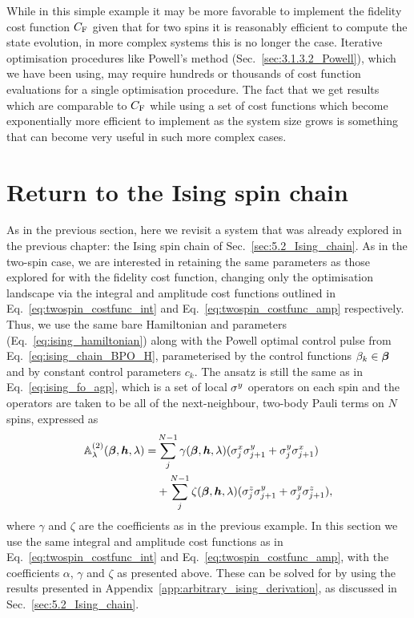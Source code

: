 While in this simple example it may be more favorable to implement the fidelity cost function $C_{\rm F}$ given that for two spins it is reasonably efficient to compute the state evolution, in more complex systems this is no longer the case. Iterative optimisation procedures like Powell's method (Sec.~\ref{sec:3.1.3.2_Powell}), which we have been using, may require hundreds or thousands of cost function evaluations for a single optimisation procedure. The fact that we get results which are comparable to $C_{\rm F}$ while using a set of cost functions which become exponentially more efficient to implement as the system size grows is something that can become very useful in such more complex cases.

\section{Return to the Ising spin chain}\label{sec:7.2_ising_ho_lcd}

As in the previous section, here we revisit a system that was already explored in the previous chapter: the Ising spin chain of Sec.~\ref{sec:5.2_Ising_chain}. As in the two-spin case, we are interested in retaining the same parameters as those explored for  with the fidelity cost function, changing only the optimisation landscape via the integral and amplitude cost functions outlined in Eq.~\eqref{eq:twospin_costfunc_int} and Eq.~\eqref{eq:twospin_costfunc_amp} respectively. Thus, we use the same bare Hamiltonian and parameters (Eq.~\eqref{eq:ising_hamiltonian}) along with the Powell optimal control pulse from Eq.~\eqref{eq:ising_chain_BPO_H}, parameterised by the control functions $\beta_k \in \boldsymbol{\beta}$ and by constant control parameters $c_k$. The   ansatz is still the same as in Eq.~\eqref{eq:ising_fo_agp}, which is a set of local $\sigma^y$ operators on each spin and the  operators are taken to be all of the next-neighbour, two-body Pauli terms on $N$ spins, expressed as
\begin{equation}
    \begin{aligned}
        \mathbb{A}_{\lambda}^{(2)}(\boldsymbol{\beta}, \boldsymbol{h}, \lambda) = & \sum_j^{N-1} \gamma(\boldsymbol{\beta}, \boldsymbol{h}, \lambda) (\sigma^x_j\sigma^y_{j+1} + \sigma^y_j\sigma^x_{j+1}) \\
        &+ \sum_j^{N-1} \zeta(\boldsymbol{\beta}, \boldsymbol{h}, \lambda) (\sigma^z_j\sigma^y_{j+1} + \sigma^y_j\sigma^z_{j+1}),
    \end{aligned}
\end{equation}
where $\gamma$ and $\zeta$ are the   coefficients as in the previous example. In this section we use the same integral and amplitude cost functions as in Eq.~\eqref{eq:twospin_costfunc_int} and Eq.~\eqref{eq:twospin_costfunc_amp}, with the coefficients $\alpha$, $\gamma$ and $\zeta$ as presented above. These can be solved for by using the results presented in Appendix~\ref{app:arbitrary_ising_derivation}, as discussed in Sec.~\ref{sec:5.2_Ising_chain}.

